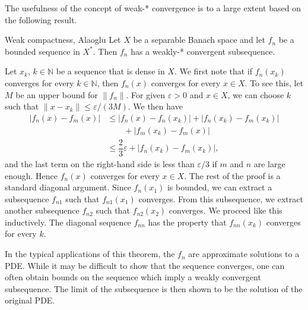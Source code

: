 The usefulness of the concept of weak-* convergence is to a large extent based on the following result.

\begin{Theorem}{Weak compactness, Alaoglu}
\label{thm:alaoglu-weak-star-subsequence}
Let $X$ be a separable Banach space and let $f_n$ be a bounded sequence in $X^*$. Then $f_n$ has a weakly-* convergent subsequence.
\end{Theorem}

\begin{Proof}
Let $x_k$, $k\in\mathbb{N}$ be a sequence that is dense in $X$. We first note that if $f_n(x_k)$ converges for every $k\in\mathbb{N}$, then $f_n(x)$ converges for every $x\in X$. To see this, let $M$ be an upper bound for $\|f_n\|$. For given $\varepsilon>0$ and $x\in X$, we can choose $k$ such that $\|x-x_k\|\leq\varepsilon/(3M)$. We then have
\begin{equation}\label{eq:alaoglu-dense-set-cauchy-estimate}
\begin{aligned}
|f_n(x)-f_m(x)|&\leq|f_n(x)-f_n(x_k)|+|f_n(x_k)-f_m(x_k)|\\
&\qquad+|f_m(x_k)-f_m(x)|\\
&\leq\dfrac{2}{3}\varepsilon+|f_n(x_k)-f_m(x_k)|,
\end{aligned}
\end{equation}
and the last term on the right-hand side is less than $\varepsilon/3$ if $m$ and $n$ are large enough. Hence $f_n(x)$ converges for every $x\in X$. The rest of the proof is a standard diagonal argument. Since $f_n(x_1)$ is bounded, we can extract a subsequence $f_{n1}$ such that $f_{n1}(x_1)$ converges. From this subsequence, we extract another subsequence $f_{n2}$ such that $f_{n2}(x_2)$ converges. We proceed like this inductively. The diagonal sequence $f_{nn}$ has the property that $f_{nn}(x_k)$ converges for every $k$.
\end{Proof}

\begin{Remark}
\label{rem:weak-compactness-approximate-pde-solutions}
In the typical applications of this theorem, the $f_n$ are approximate solutions to a PDE. While it may be difficult to show that the sequence converges, one can often obtain bounds on the sequence which imply a weakly convergent subsequence. The limit of the subsequence is then shown to be the solution of the original PDE.
\end{Remark}
